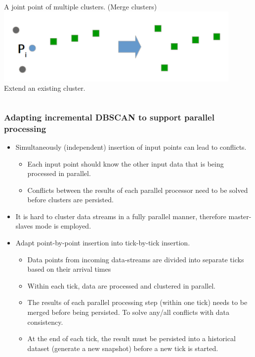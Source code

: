 \begin{frame}
\begin{columns}
            \\ \tiny A joint point of multiple clusters. (Merge clusters)
            \centering
            \includegraphics[width=0.9\textwidth]{resource/figures/condition4.png}
            \\ \tiny Extend an existing cluster.
    \end{columns}
\end{frame}

\begin{frame}
    \frametitle{Adapting incremental DBSCAN to support parallel processing}
    \begin{itemize}
        \item Simultaneously (independent) insertion of input points can lead to conflicts.
        \begin{itemize}
	        \item \small Each input point should know the other input data that is being processed in parallel.
	        \item \small Conflicts between the results of each parallel processor need to be solved before clusters are persisted.
        \end{itemize}
        \item It is hard to cluster data streams in a fully parallel manner, therefore master-slaves mode is employed.
        \item Adapt point-by-point insertion into tick-by-tick insertion.
        \begin{itemize}
            \item \tiny Data points from incoming data-streams are divided into separate ticks based on their arrival times
            \item \tiny Within each tick, data are processed and clustered in parallel.
            \item \tiny The results of each parallel processing step (within one tick) needs to be merged before being persisted. To solve any/all conflicts with data consistency.
            \item \tiny At the end of each tick, the result must be persisted into a historical dataset (generate a new snapshot) before a new tick is started.
        \end{itemize}
    \end{itemize}
\end{frame}

